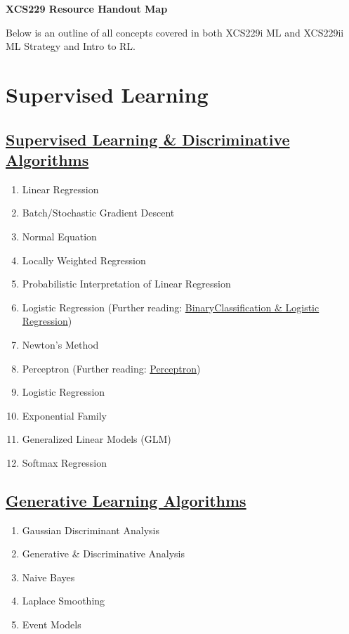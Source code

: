 \documentclass{article}
\begin{document}
\begin{center}
  \textbf{\large{XCS229 Resource Handout Map}}

  \small{Below is an outline of all concepts covered in both XCS229i ML and XCS229ii ML Strategy and Intro to RL.}
\end{center}

\vspace{-2.5mm}
\section{Supervised Learning}
\vspace{-2.5mm}
\subsection{ \href{https://github.com/scpd-proed/XCS229-Handouts/blob/main/Supervised\%20Learning\%20and\%20Discriminative\%20Algorithms.pdf}{Supervised Learning \& Discriminative Algorithms}}
\vspace{-2.5mm}
\begin{enumerate}
  \setlength\itemsep{-0.25em}
  \item Linear Regression
  \item Batch/Stochastic Gradient Descent
  \item Normal Equation
  \item Locally Weighted Regression
  \item Probabilistic Interpretation of Linear Regression
  \item Logistic Regression (Further reading: \href{https://github.com/scpd-proed/XCS229-Handouts/blob/main/Binary\%20Classification\%20and\%20Logistic\%20Regression.pdf}{BinaryClassification \& Logistic Regression})
  \item Newton’s Method
  \item Perceptron (Further reading: \href{https://github.com/scpd-proed/XCS229-Handouts/blob/main/Perceptron.pdf}{Perceptron})
  \item Logistic Regression
  \item Exponential Family
  \item Generalized Linear Models (GLM)
  \item Softmax Regression
\end{enumerate}
\vspace{-2.5mm}
\subsection{\href{https://github.com/scpd-proed/XCS229-Handouts/blob/main/Generative\%20Learning\%20Algorithms.pdf}{Generative Learning Algorithms}}
\vspace{-2.5mm}
\begin{enumerate}
  \setlength\itemsep{-0.25em}
  \item Gaussian Discriminant Analysis
  \item Generative \& Discriminative Analysis
  \item Naive Bayes
  \item Laplace Smoothing
  \item Event Models
\end{enumerate}
\vspace{-2.5mm}
\end{document}

